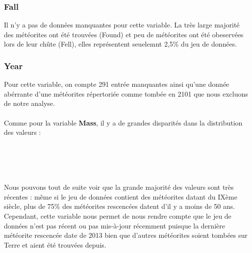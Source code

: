 \documentclass[12pt]{article}
\begin{document}
\subsubsection*{Fall}
Il n'y a pas de données manquantes pour cette variable. La très large majorité des météorites ont été trouvées (Found) et peu de météorites ont été obeservées lors de leur chûte (Fell), elles représentent seuelemnt 2,5\% du jeu de données.
\subsubsection*{Year}
Pour cette variable, on compte 291 entrée manquantes ainsi qu'une donnée abérrante d'une météorites répertoriée comme tombée en 2101 que nous excluons de notre analyse.\\
\\
Comme pour la variable \textbf{Mass}, il y a de grandes disparités dans la distribution des valeurs :\\
\\
\\
\\
\\
Nous pouvons tout de suite voir que la grande majorité des valeurs sont très récentes : même si le jeu de données contient des météorites datant du IXème siècle, plus de 75\% des météorites rescencées datent d'il y a moins de 50 ans. Cependant, cette variable nous permet de nous rendre compte que le jeu de données n'est pas récent ou pas mis-à-jour récemment puisque la dernière météorite rescencée date de 2013 bien que d'autres météorites soient tombées sur Terre et aient été trouvées depuis.\\
\end{document}
